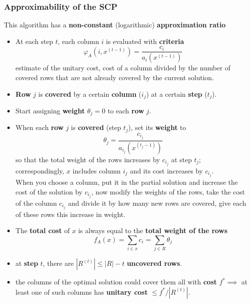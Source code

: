 \subsubsection{Approximability of the SCP}
This algorithm has a \textbf{non-constant} (logarithmic) \textbf{approximation ratio}
\begin{itemize}
	\item At each step $t$, each column $i$ is evaluated with \textbf{criteria}
	$$ \varphi_A \left(i, x^{(t-1)}\right) = \frac{c_i}{a_i \left(x^{(t-1)}\right)} $$
	estimate of the unitary cost, cost of a column divided by the number of covered rows that are not already covered by the current solution.\\
	
	\item \textbf{Row} $j$ is \textbf{covered} by a certain \textbf{column} ($i_j$) at a certain \textbf{step} ($t_j$).\\
	
	\item Start assigning \textbf{weight} $\theta_j = 0$ to each \textbf{row} $j$.\\
	
	\item When each \textbf{row} $j$ is \textbf{covered} (step $t_j$), set its \textbf{weight} to
	$$ \theta_j = \frac{c_{i_j}}{a_{i_j} \left(x^{(t_j - 1)}\right)}$$
	so that the total weight of the rows increases by $c_{i_j}$ at step $t_j$; correspondingly, $x$ includes column $i_j$ and its cost increases by $c_{i_j}$.\\
	When you choose a column, put it in the partial solution and increase the cost of the solution by $c_{i_j}$, now modify the weights of the rows, take the cost of the column $c_{i_j}$ and divide it by how many new rows are covered, give each of these rows this increase in weight.\\
	
	\item The \textbf{total cost} of $x$ is always equal to the \textbf{total weight of the rows}
	$$ f_A (x) = \sum_{i \in x} c_i = \sum_{j \in R} \theta_j $$
	\nn
	
	\item at \textbf{step} $t$, there are $|R^{(t)}| \leq |R| − t$ \textbf{uncovered rows}.\\
	
	\newpage
	
	\item the columns of the optimal solution could cover them all with \textbf{cost} $f^\ast \implies$ at least one of such columns has \textbf{unitary cost} $\leq f^\ast /|R^{(t)}|$.\\
	

\end{itemize}
